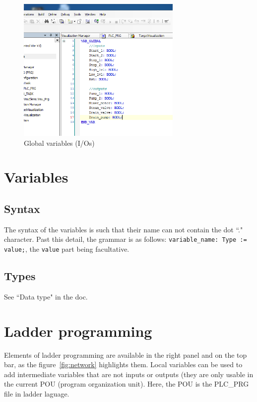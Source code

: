 \documentclass[10pt,a4paper]{article}
\begin{document}
\begin{figure}[h!]
	\begin{center}
		\includegraphics[width=300px]{img6.PNG}
	\end{center}
\caption{Global variables (I/Os)}
\label{fig:glob_var}
\end{figure}


\section{Variables}

\subsection{Syntax}
The syntax of the variables is such that their name can not contain the dot ``." character.
Past this detail, the grammar is as follows: \texttt{variable\_name: Type := value;}, the \texttt{value} part being facultative.

\subsection{Types}
See ``Data type" in the doc.


\section{Ladder programming}

Elements of ladder programming are available in the right panel and on the top bar, as the figure~\ref{fig:network} highlights them.
Local variables can be used to add intermediate variables that are not inputs or outputs (they are only usable in the current POU (program organization unit). Here, the POU is the PLC\_PRG file in ladder laguage.
\end{document}
